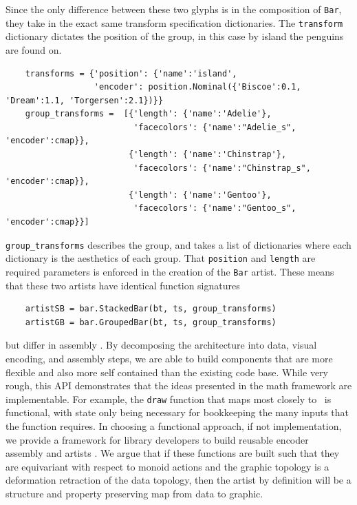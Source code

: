 \documentclass[../main.tex]{subfiles}
\begin{document}
Since the only difference between these two glyphs is in the composition of \texttt{Bar}, they take in the exact same transform specification dictionaries. The \texttt{transform} dictionary dictates the position of the group, in this case by island the penguins are found on.

\begin{verbatim}
    transforms = {'position': {'name':'island',
                  'encoder': position.Nominal({'Biscoe':0.1, 'Dream':1.1, 'Torgersen':2.1})}} 
    group_transforms =  [{'length': {'name':'Adelie'},
                          'facecolors': {'name':"Adelie_s", 'encoder':cmap}},
                         {'length': {'name':'Chinstrap'},
                          'facecolors': {'name':"Chinstrap_s", 'encoder':cmap}}, 
                         {'length': {'name':'Gentoo'},
                          'facecolors': {'name':"Gentoo_s", 'encoder':cmap}}]
    \end{verbatim}
    \texttt{group_transforms} describes the group, and takes a list of dictionaries where each dictionary is the aesthetics of each group. That \texttt{position} and \texttt{length} are required parameters is enforced in the creation of the \texttt{Bar} artist. These means that these two artists have identical function signatures
    
    \begin{verbatim}
    artistSB = bar.StackedBar(bt, ts, group_transforms)
    artistGB = bar.GroupedBar(bt, ts, group_transforms)
    \end{verbatim}
    
    but differ in assembly \vmarkd. By decomposing the architecture into data, visual encoding, and assembly steps, we are able to build components that are more flexible and also more self contained than the existing code base. While very rough, this API demonstrates that the ideas presented in the math framework are implementable. For example, the \texttt{draw} function that maps most closely to \vartist\ is functional, with state only being necessary for bookkeeping the many inputs that the function requires. In choosing a functional approach, if not implementation, we provide a framework for library developers to build reusable encoder \vchannel\, assembly \vmarkd and artists \vartist. We argue that  if these functions are built such that they are equivariant with respect to monoid actions and the graphic topology is a deformation retraction of the data topology, then the artist by definition will be a structure and property preserving map from data to graphic. 
    
\end{document}
